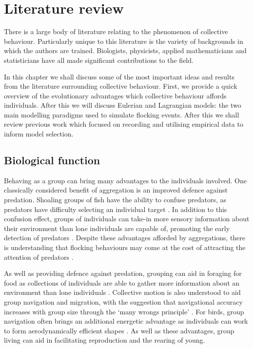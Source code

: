 \graphicspath{{fig/lit_review/}}

\chapter{Literature review}
\label{cha:lit_review}

There is a large body of literature relating to the phenomenon of collective behaviour.
Particularly unique to this literature is the variety of backgrounds in which the authors
are trained. Biologists, physicists, applied mathematicians and statisticians have all
made significant contributions to the field.

In this chapter we shall discuss some of the most important ideas and results from the
literature surrounding collective behaviour. First, we provide a quick overview of the
evolutionary advantages which collective behaviour affords individuals. After this we will
discuss Eulerian and Lagrangian models: the two main modelling paradigms used to simulate
flocking events. After this we shall review previous work which focused on recording and
utilising empirical data to inform model selection.

\section{Biological function}
\label{sec:biological_function}

Behaving as a group can bring many advantages to the individuals involved. One classically
considered benefit of aggregation is an improved defence against predation. Shoaling
groups of fish have the ability to confuse predators, as predators have difficulty
selecting an individual target \parencite{landeau86}.  In addition to this confusion
effect, groups of individuals can take-in more sensory information about their environment
than lone individuals are capable of, promoting the early detection of predators
\parencite{pitcher93}. Despite these advantages afforded by aggregations, there is
understanding that flocking behaviours may come at the cost of attracting the attention of 
predators \parencite{wittenberger85}.

As well as providing defence against predation, grouping can aid in foraging for food as
collections of individuals are able to gather more information about an environment than
lone individuals \parencite{clark86}. Collective motion is also understood to aid group
navigation and migration, with the suggestion that navigational accuracy increases with
group size through the `many wrongs principle' \parencite{simmons04}. For birds, group
navigation often brings an additional energetic advantage as individuals can work to form
aerodynamically efficient shapes \parencite{weimerskirch01}. As well as these advantages,
group living can aid in facilitating reproduction and the rearing of young.

